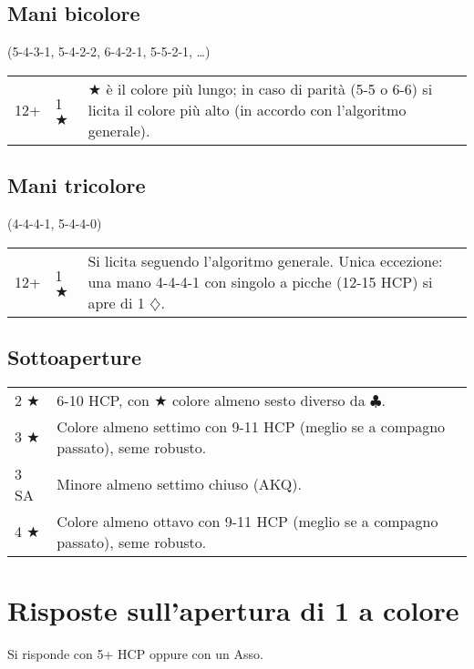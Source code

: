 \documentclass[a4paper,10pt]{article}
\renewcommand{\c}{$\clubsuit$\xspace}
\renewcommand{\d}{$\diamondsuit$\xspace}
\renewcommand{\j}{$\bigstar$\xspace}
\newcommand{\sa}{SA\xspace}
\newcommand{\smallspace}{\vskip0.3cm}
\newenvironment{twocol}
  {\smallspace\noindent\begin{tabular}{l p{0.78\textwidth}}}
  {\end{tabular}\smallspace}
\newenvironment{threecol}
  {\smallspace\noindent\begin{tabular}{l l p{0.78\textwidth}}}
  {\end{tabular}\smallspace}
\begin{document}
\subsection{Mani bicolore}
(5-4-3-1, 5-4-2-2, 6-4-2-1, 5-5-2-1, \dots)

\begin{threecol}
 12+ & 1 \j & \j è il colore più lungo; in caso di parità (5-5 o 6-6) si licita il colore più alto (in accordo con l'algoritmo generale).
\end{threecol}


\subsection{Mani tricolore}
(4-4-4-1, 5-4-4-0)

\begin{threecol}
 12+ & 1 \j & Si licita seguendo l'algoritmo generale. Unica eccezione: una mano 4-4-4-1 con singolo a picche (12-15 HCP) si apre di 1 \d.
\end{threecol}


\subsection{Sottoaperture}

\begin{twocol}
 2 \j & 6-10 HCP, con \j colore almeno sesto diverso da \c.\\
 3 \j & Colore almeno settimo con 9-11 HCP (meglio se a compagno passato), seme robusto.\\
 3 \sa & Minore almeno settimo chiuso (AKQ).\\
 4 \j & Colore almeno ottavo con 9-11 HCP (meglio se a compagno passato), seme robusto.
\end{twocol}

\pagebreak

\section{Risposte sull'apertura di 1 a colore}

Si risponde con 5+ HCP oppure con un Asso.
\end{document}
